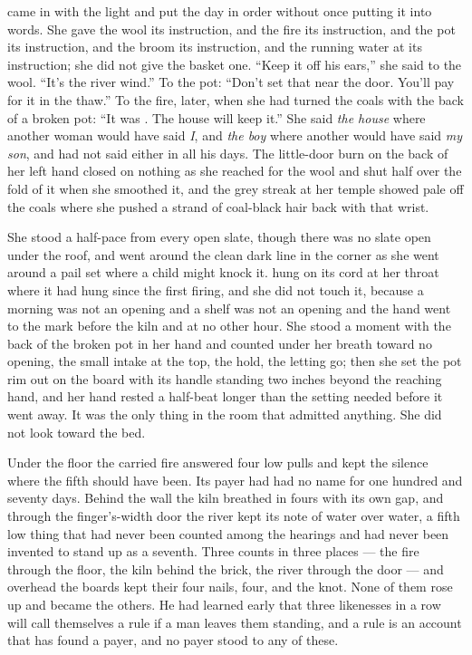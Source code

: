  came in with the light and put the day in order without once putting it into words. She gave the wool its instruction, and the fire its instruction, and the pot its instruction, and the broom its instruction, and the running water at  its instruction; she did not give the basket one. “Keep it off his ears,” she said to the wool. “It's the river wind.” To the pot: “Don't set that near the door. You'll pay for it in the thaw.” To the fire, later, when she had turned the coals with the back of a broken pot: “It was . The house will keep it.” She said \emph{the house} where another woman would have said \emph{I}, and \emph{the boy} where another would have said \emph{my son}, and had not said either in all his days. The little-door burn on the back of her left hand closed on nothing as she reached for the wool and shut half over the fold of it when she smoothed it, and the grey streak at her temple showed pale off the coals where she pushed a strand of coal-black hair back with that wrist.

She stood a half-pace from every open slate, though there was no slate open under the roof, and went around the clean dark line in the corner as she went around a pail set where a child might knock it.  hung on its cord at her throat where it had hung since the first firing, and she did not touch it, because a morning was not an opening and a shelf was not an opening and the hand went to the mark before the kiln and at no other hour. She stood a moment with the back of the broken pot in her hand and counted under her breath toward no opening, the small intake at the top, the hold, the letting go; then she set the pot rim out on the board with its handle standing two inches beyond the reaching hand, and her hand rested a half-beat longer than the setting needed before it went away. It was the only thing in the room that admitted anything. She did not look toward the bed.

Under the floor the carried fire answered four low pulls and kept the silence where the fifth should have been. Its payer had had no name for one hundred and seventy days. Behind the wall the kiln breathed in fours with its own gap, and through the finger's-width door the river kept its note of water over water, a fifth low thing that had never been counted among the hearings and had never been invented to stand up as a seventh. Three counts in three places --- the fire through the floor, the kiln behind the brick, the river through the door --- and overhead the boards kept their four nails, four, and the knot. None of them rose up and became the others. He had learned early that three likenesses in a row will call themselves a rule if a man leaves them standing, and a rule is an account that has found a payer, and no payer stood to any of these.

